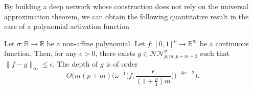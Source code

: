 \documentclass[anon,12pt]{colt2021} %
\begin{document}
By building a deep network whose construction does not rely on the universal approximation theorem, we can obtain the following quantitative result in the case of a polynomial activation function.

\begin{proposition} \label{proppoly}
Let $\sigma : \mathbb{R} \rightarrow \mathbb{R}$ be a non-affine polynomial. Let $f: [0,1]^{p} \rightarrow \mathbb{R}^{m}$ be a continuous function. Then, for any $\epsilon > 0$, there exists $g \in \mathcal{NN}_{p,m,p+m+3}^{\sigma}$ such that $\| f - g \|_{\infty} \leq \epsilon$. The depth of $g$ is of order
\begin{equation*}
    O \bigg(m(p+m)\bigg(\omega^{-1} \big(f, \frac{\epsilon}{(1+\frac{p}{4})m} \big) \bigg)^{-4p-2} \bigg).
\end{equation*}
\end{proposition}
\end{document}
